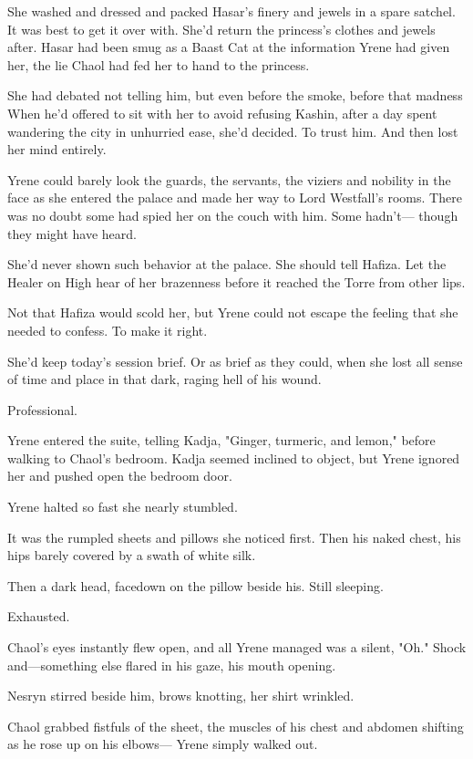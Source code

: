 She washed and dressed and packed Hasar's finery and jewels in a spare satchel. It was best to get it over with. She'd return the princess's clothes and jewels after. Hasar had been smug as a Baast Cat at the information Yrene had given her, the lie Chaol had fed her to hand to the princess.

She had debated not telling him, but even before the smoke, before that madness  When he'd offered to sit with her to avoid refusing Kashin, after a day spent wandering the city in unhurried ease, she'd decided. To trust him. And then lost her mind entirely.

Yrene could barely look the guards, the servants, the viziers and nobility in the face as she entered the palace and made her way to Lord Westfall's rooms. There was no doubt some had spied her on the couch with him. Some hadn't--- though they might have heard.

She'd never shown such behavior at the palace. She should tell Hafiza. Let the Healer on High hear of her brazenness before it reached the Torre from other lips.

Not that Hafiza would scold her, but  Yrene could not escape the feeling that she needed to confess. To make it right.

She'd keep today's session brief. Or as brief as they could, when she lost all sense of time and place in that dark, raging hell of his wound.

Professional.

Yrene entered the suite, telling Kadja, "Ginger, turmeric, and lemon," before walking to Chaol's bedroom. Kadja seemed inclined to object, but Yrene ignored her and pushed open the bedroom door.

Yrene halted so fast she nearly stumbled.

It was the rumpled sheets and pillows she noticed first. Then his naked chest, his hips barely covered by a swath of white silk.

Then a dark head, facedown on the pillow beside his. Still sleeping.

Exhausted.

Chaol's eyes instantly flew open, and all Yrene managed was a silent, "Oh." Shock and---something else flared in his gaze, his mouth opening.

Nesryn stirred beside him, brows knotting, her shirt wrinkled.

Chaol grabbed fistfuls of the sheet, the muscles of his chest and abdomen shifting as he rose up on his elbows--- Yrene simply walked out.

